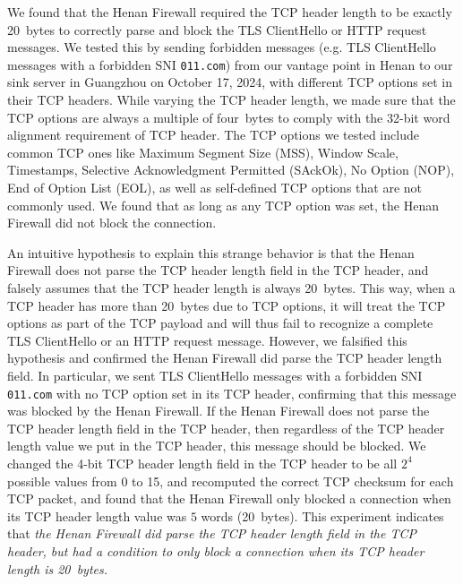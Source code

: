 \documentclass[conference,compsoc]{IEEEtran}
\begin{document}
We found that the Henan Firewall required the TCP header length
to be exactly 20~bytes to correctly parse and block the TLS ClientHello or HTTP request messages.
%
We tested this by sending forbidden messages
(e.g. TLS ClientHello messages with a forbidden SNI \texttt{011.com})
from our vantage point in Henan to our sink server in Guangzhou
on October 17, 2024,
with different TCP options set in their TCP headers.
While varying the TCP header length,
we made sure that the TCP options are always a multiple of four~bytes
to comply with the 32-bit word alignment requirement of TCP header.
The TCP options we tested include common TCP ones like
Maximum Segment Size (MSS), Window Scale, Timestamps,
Selective Acknowledgment Permitted (SAckOk),
No Option (NOP), End of Option List (EOL),
as well as self-defined TCP options that are not commonly used.
We found that as long as any TCP option was set,
the Henan Firewall did not block the connection.

An intuitive hypothesis to explain this strange behavior is that
the Henan Firewall does not parse the TCP header length field in the TCP header,
and falsely assumes that the TCP header length is always 20~bytes.
This way,
when a TCP header has more than 20~bytes due to TCP options,
it will treat the TCP options as part of the TCP payload
and will thus fail to recognize a complete TLS ClientHello or an HTTP request message.
However, we falsified this hypothesis and confirmed the Henan Firewall did parse the TCP header length field.
In particular,
we sent TLS ClientHello messages with a forbidden SNI \texttt{011.com} with no TCP option set in its TCP header,
confirming that this message was blocked by the Henan Firewall.
If the Henan Firewall does not parse the TCP header length field in the TCP header,
then regardless of the TCP header length value we put in the TCP header,
this message should be blocked.
We changed the 4-bit TCP header length field in the TCP header to be all $2^4$ possible values from 0 to 15,
and recomputed the correct TCP checksum for each TCP packet,
and found that the Henan Firewall only blocked a connection when its TCP header length value was $5$ words (20~bytes).
This experiment indicates that \emph{the Henan Firewall did parse the TCP header length field in the TCP header,
but had a condition to only block a connection when its TCP header length is 20~bytes.}
\end{document}
